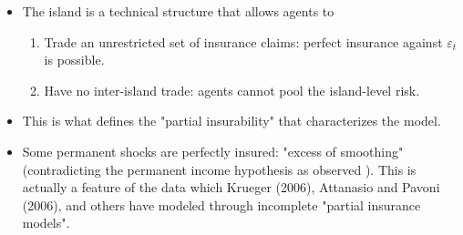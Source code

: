 \documentclass[notes=show]{beamer}
\begin{document}
\begin{frame}%


\begin{itemize}
\item The island is a technical structure that allows agents to

\begin{enumerate}
\item Trade an unrestricted set of insurance claims: perfect insurance
against $\varepsilon _{t}$ is possible.

\item Have no inter-island trade: agents cannot pool the island-level risk.
\end{enumerate}

\item This is what defines the "partial insurability" that characterizes the
model.

\item Some permanent shocks are perfectly insured: "excess of smoothing"
(contradicting the permanent income hypothesis as observed ). This is
actually a feature of the data which Krueger (2006), Attanasio and Pavoni
(2006), and others have modeled through incomplete "partial insurance
models".
\end{itemize}

\transboxout%
\end{frame}%

\bigskip
\end{document}
